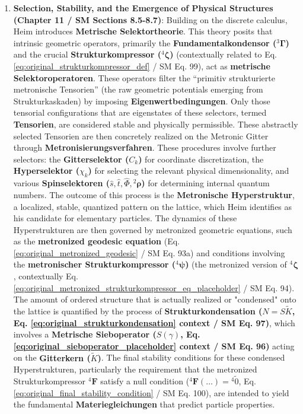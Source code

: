 \documentclass[
    12pt,              %
    a4paper,           %
    headings=normal,   %
    twoside=true,      %
    BCOR=8mm,          %
]{scrbook}
\newcommand{\q}[1]{\enquote{#1}}
\newcommand{\fundamentalkondensor}{{}^3\bm{\Gamma}}
\newcommand{\metronintegral}{S}
\newcommand{\metrischesieboperator}{S(\gamma)}
\newcommand{\strukturkompressor}{{}^4\bm{\zeta}}
\newcommand{\metronischerstrukturkompressor}{{}^4\bm{\psi}}
\newcommand{\metronisiertekondensor}[1]{{}^{#1}\mathbf{F}}
\begin{document}
\begin{enumerate}
    \item \textbf{Selection, Stability, and the Emergence of Physical Structures (Chapter 11 / SM Sections 8.5-8.7)}: Building on the discrete calculus, Heim introduces \textbf{Metrische Selektortheorie}. This theory posits that intrinsic geometric operators, primarily the \textbf{Fundamentalkondensor (\( \fundamentalkondensor \))} and the crucial \textbf{Strukturkompressor (\( \strukturkompressor \))} (contextually related to Eq. \eqref{eq:original_strukturkompressor_def} / SM Eq. 99), act as \textbf{metrische Selektoroperatoren}. These operators filter the \q{primitiv strukturierte metronische Tensorien} (the raw geometric potentials emerging from Strukturkaskaden) by imposing \textbf{Eigenwertbedingungen}. Only those tensorial configurations that are eigenstates of these selectors, termed \textbf{Tensorien}, are considered stable and physically permissible. These abstractly selected Tensorien are then concretely realized on the Metronic Gitter through \textbf{Metronisierungsverfahren}. These procedures involve further selectors: the \textbf{Gitterselektor (\( C_k \))} for coordinate discretization, the \textbf{Hyperselektor (\( \chi_k \))} for selecting the relevant physical dimensionality, and various \textbf{Spinselektoren (\( \hat{s}, \hat{t}, \hat{\Phi}, {}^2\bm{\rho} \))} for determining internal quantum numbers. The outcome of this process is the \textbf{Metronische Hyperstruktur}, a localized, stable, quantized pattern on the lattice, which Heim identifies as his candidate for elementary particles. The dynamics of these Hyperstrukturen are then governed by metronized geometric equations, such as the \textbf{metronized geodesic equation} (Eq. \eqref{eq:original_metronized_geodesic} / SM Eq. 93a) and conditions involving the \textbf{metronischer Strukturkompressor (\( \metronischerstrukturkompressor \))} (the metronized version of \( \strukturkompressor \), contextually Eq. \eqref{eq:original_metronized_strukturkompressor_eq_placeholder} / SM Eq. 94). The amount of ordered structure that is actually realized or "condensed" onto the lattice is quantified by the process of \textbf{Strukturkondensation (\( N = \metronintegral\tilde{K} \), Eq. \eqref{eq:original_strukturkondensation} context / SM Eq. 97)}, which involves a \textbf{Metrische Sieboperator (\( \metrischesieboperator \), Eq. \eqref{eq:original_sieboperator_placeholder} context / SM Eq. 96)} acting on the \textbf{Gitterkern (\( \tilde{K} \))}. The final stability conditions for these condensed Hyperstrukturen, particularly the requirement that the metronized Strukturkompressor \( \metronisiertekondensor{4} \) satisfy a null condition (\( \metronisiertekondensor{4}(\dots) = {}^{4}\tilde{0} \), Eq. \eqref{eq:original_final_stability_condition} / SM Eq. 100), are intended to yield the fundamental \textbf{Materiegleichungen} that predict particle properties.


\end{enumerate}
\end{document}
